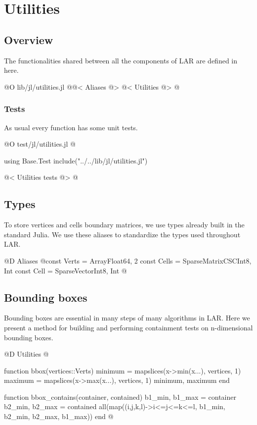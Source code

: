\chapter{Utilities}
\label{ch:utilities}

\section{Overview}

The functionalities shared between all the components of LAR
are defined in here.

@O lib/jl/utilities.jl
@{@< Aliases @>
@< Utilities @>
@}

\subsection{Tests}
As usual every function has some unit tests.

@O test/jl/utilities.jl
@{using Base.Test
include("../../lib/jl/utilities.jl")

@< Utilities tests @>
@}


\section{Types}

To store vertices and cells boundary matrices, 
we use types already built in the standard Julia.
We use these aliases to standardize the types used 
throughout LAR. 

@D Aliases
@{const Verts = Array{Float64, 2}
const Cells = SparseMatrixCSC{Int8, Int}
const Cell = SparseVector{Int8, Int}
@}




\section{Bounding boxes}
\label{sec:bboxes}

Bounding boxes are essential in many steps of many
algorithms in LAR. Here we present a method for building
and performing containment tests on n-dimensional bounding boxes.

@D Utilities
@{function bbox(vertices::Verts)
    minimum = mapslices(x->min(x...), vertices, 1)
    maximum = mapslices(x->max(x...), vertices, 1)
    minimum, maximum
end

function bbox_contains(container, contained)
    b1_min, b1_max = container
    b2_min, b2_max = contained
    all(map((i,j,k,l)->i<=j<=k<=l, b1_min, b2_min, b2_max, b1_max))
end
@}

